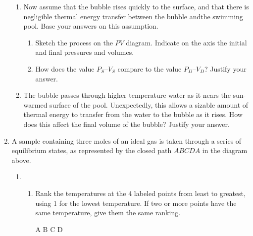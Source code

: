 \documentclass{../../../oss-apphys}
\begin{document}
\begin{enumerate}[leftmargin=15pt]
\begin{enumerate}[leftmargin=18pt]
  \item Now assume that the bubble rises quickly to the surface, and that
    there is negligible thermal energy transfer between the bubble andthe
    swimming pool. Base your answers on this assumption.
    \begin{enumerate}
    \item Sketch the process on the $PV$ diagram. Indicate on the axis the
      initial and final pressures and volumes.
    \item How does the value $P_S$--$V_S$ compare to the value $P_D$--$V_D$?
      Justify your answer.
    \end{enumerate}
    \vspace{1.75in}
    
  \item The bubble passes through higher temperature water as it nears the
    sun-warmed surface of the pool. Unexpectedly, this allows a
    sizable amount of thermal energy to transfer from the water to the
    bubble as it rises. How does this affect the final volume of the
    bubble? Justify your answer.
  \end{enumerate}
  \newpage

  \begin{center}
  \end{center}
\item A sample containing three moles of an ideal gas is taken through a series
  of equilibrium states, as represented by the closed path $ABCDA$ in the
  diagram above.
  \begin{enumerate}[leftmargin=18pt]
  \item
    \begin{enumerate}[leftmargin=18pt]
    \item Rank the temperatures at the 4 labeled points from least to greatest,
      using 1 for the lowest temperature. If two or more points have the same
      temperature, give them the same ranking.

      \vspace{.1in}
      \underline{\hspace{.3in}} A\hspace{.2in}
      \underline{\hspace{.3in}} B\hspace{.2in}
      \underline{\hspace{.3in}} C\hspace{.2in}
      \underline{\hspace{.3in}} D
      

\end{enumerate}
\end{enumerate}
\end{enumerate}
\end{document}
